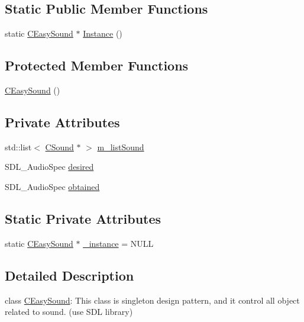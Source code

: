 \subsection*{Static Public Member Functions}
\begin{DoxyCompactItemize}
\item 
static \hyperlink{class_c_easy_sound}{C\+Easy\+Sound} $\ast$ \hyperlink{class_c_easy_sound_a89e74a3e4cf2bd0e72c3bbf6901dcb7c}{Instance} ()
\end{DoxyCompactItemize}
\subsection*{Protected Member Functions}
\begin{DoxyCompactItemize}
\item 
\hyperlink{class_c_easy_sound_a4a18c7ef207c8a00470c19f07044f8b6}{C\+Easy\+Sound} ()
\end{DoxyCompactItemize}
\subsection*{Private Attributes}
\begin{DoxyCompactItemize}
\item 
std\+::list$<$ \hyperlink{class_c_sound}{C\+Sound} $\ast$ $>$ \hyperlink{class_c_easy_sound_ab9462a201705d5314d8672417841f76c}{m\+\_\+list\+Sound}
\item 
S\+D\+L\+\_\+\+Audio\+Spec \hyperlink{class_c_easy_sound_a0bba6237523136bdd2f2698b489ab0c5}{desired}
\item 
S\+D\+L\+\_\+\+Audio\+Spec \hyperlink{class_c_easy_sound_a1e163bfd31003aed603af84b9464a82c}{obtained}
\end{DoxyCompactItemize}
\subsection*{Static Private Attributes}
\begin{DoxyCompactItemize}
\item 
static \hyperlink{class_c_easy_sound}{C\+Easy\+Sound} $\ast$ \hyperlink{class_c_easy_sound_ac1894785d41ee50082c2592cb8fa6ff1}{\+\_\+instance} = N\+U\+LL
\end{DoxyCompactItemize}


\subsection{Detailed Description}
class \hyperlink{class_c_easy_sound}{C\+Easy\+Sound}\+: This class is singleton design pattern, and it control all object related to sound. (use S\+DL library)

